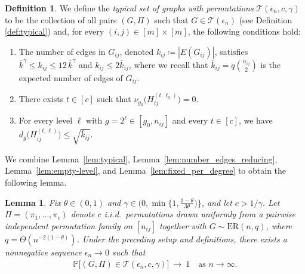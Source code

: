 \documentclass[journal]{IEEEtran}
\newtheorem{lemma}{Lemma}
\theoremstyle{definition}
\theoremstyle{definition}
\newtheorem{definition}{Definition}
\newcommand{\Tc}{\mathcal{T}}
\newcommand{\PP}{\mathbb{P}}
\newcommand{\PV}{\nu}
\newcommand{\kb}{\overline{k}}
\begin{document}
\begin{definition} \label{def:new_typical}
    We define the \emph{typical set of graphs with permutations} \(\mathcal{T}(\epsilon_n,c,\gamma)\) to be the collection of all pairs \((G,\Pi)\) such that \(G \in \Tc(\epsilon_n)\) (see Definition \ref{def:typical}) and, for every \((i,j)\in[m]\times[m]\), the following conditions hold:
    \begin{enumerate}
      \item[(C1)] The number of edges in \(G_{ij}\), denoted \(k_{ij}\coloneqq |E(G_{ij})|\), satisfies \(\kb^{\gamma} \le k_{ij} \le 12\,\kb^{\gamma}\) and $k_{ij} \leq 2\kb_{ij}$, where we recall that $\kb_{ij} = q \binom{n_{ij}}{2}$ is the expected number of edges of $G_{ij}$.
      \item[(C2)] There exists \(t\in[c]\) such that \(\PV_{g_0} \big(H_{ij}^{(t,\ell_0)}\big)=0\).
      \item[(C3)] For every level \(\ell\) with \(g=2^{\ell}\in[g_0,n_{ij}]\) and every \(t\in[c]\), we have \(d_{g} \big(H_{ij}^{(t,\ell)}\big)\leq \sqrt{\kb_{ij}}\). %
    \end{enumerate}
\end{definition}

We combine Lemma~\ref{lem:typical}, Lemma~\ref{lem:number_edges_reducing}, Lemma~\ref{lem:empty-level}, and Lemma~\ref{lem:fixed_per_degree} to obtain the following lemma. 
\begin{lemma}\label{lem:typical_permutation}
Fix \(\theta \in (0,1)\) and \(\gamma \in \bigl(0, \min \{1, \tfrac{1-\theta}{3\theta}\bigr) \}\), and let \(c > 1/\gamma\). Let \(\Pi=(\pi_1,\ldots,\pi_c)\) denote \(c\) i.i.d.\ permutations drawn uniformly from a pairwise independent permutation family on \([n_{ij}]\) together with \(G \sim \mathrm{ER}(n,q)\), where $q = \Theta(n^{-2(1-\theta)})$. Under the preceding setup and definitions, there exists a nonnegative sequence \(\epsilon_n \to 0\) such that
\begin{align*}
  \PP \Big[ (G,\Pi) \in \mathcal{T}(\epsilon_n,c,\gamma) \Big]\ \to\ 1 
  \quad \text{as } n \to \infty.
\end{align*}
\end{lemma}

\end{document}
